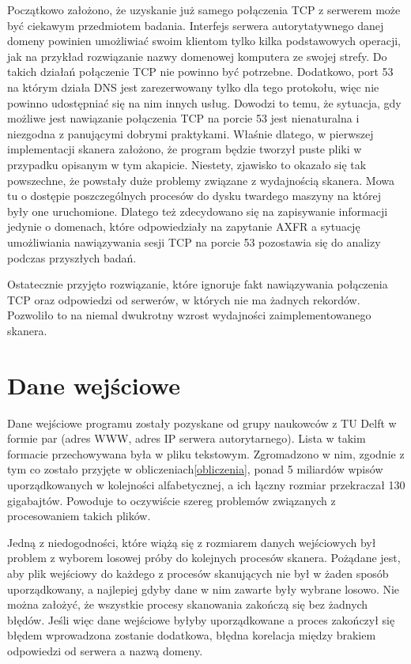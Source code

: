 Początkowo założono, że uzyskanie już samego połączenia TCP z serwerem może być ciekawym przedmiotem badania. Interfejs serwera
autorytatywnego danej domeny powinien umożliwiać swoim klientom tylko kilka podstawowych operacji, jak na przykład rozwiązanie nazwy
domenowej komputera ze swojej strefy. Do takich działań połączenie TCP nie powinno być potrzebne. Dodatkowo, port 53 na którym działa
DNS jest zarezerwowany tylko dla tego protokołu, więc nie powinno udostępniać się na nim innych usług. Dowodzi to temu, że sytuacja,
gdy możliwe jest nawiązanie połączenia TCP na porcie 53 jest nienaturalna i niezgodna z panującymi dobrymi praktykami. Właśnie dlatego,
w pierwszej implementacji skanera założono, że program będzie tworzył puste pliki w przypadku opisanym w tym akapicie. Niestety,
zjawisko to okazało się tak powszechne, że powstały duże problemy związane z wydajnością skanera. Mowa tu o dostępie poszczególnych
procesów do dysku twardego maszyny na której były one uruchomione. Dlatego też zdecydowano się na zapisywanie informacji jedynie o
domenach, które odpowiedziały na zapytanie AXFR a sytuację umożliwiania nawiązywania sesji TCP na porcie 53 pozostawia się do analizy
podczas przyszłych badań.

Ostatecznie przyjęto rozwiązanie, które ignoruje fakt nawiązywania połączenia TCP oraz odpowiedzi od serwerów, w których nie ma
żadnych rekordów. Pozwoliło to na niemal dwukrotny wzrost wydajności zaimplementowanego skanera.

\section{Dane wejściowe}
Dane wejściowe programu zostały pozyskane od grupy naukowców z TU Delft\cite{delft} w formie par (adres WWW, adres IP serwera
autorytarnego). Lista w takim formacie przechowywana była w pliku tekstowym. Zgromadzono w nim, zgodnie z tym co zostało przyjęte
w obliczeniach\ref{obliczenia}, ponad 5 miliardów wpisów uporządkowanych w kolejności alfabetycznej, a ich łączny rozmiar przekraczał
130 gigabajtów. Powoduje to oczywiście szereg problemów związanych z procesowaniem takich plików.

Jedną z niedogodności, które wiążą się z rozmiarem danych wejściowych był problem z wyborem losowej próby do kolejnych procesów
skanera. Pożądane jest, aby plik wejściowy do każdego z procesów skanujących nie był w żaden sposób uporządkowany, a najlepiej
gdyby dane w nim zawarte były wybrane losowo. Nie można założyć, że wszystkie procesy skanowania zakończą się bez żadnych błędów.
Jeśli więc dane wejściowe byłyby uporządkowane a proces zakończył się błędem wprowadzona zostanie dodatkowa, błędna korelacja między
brakiem odpowiedzi od serwera a nazwą domeny.

